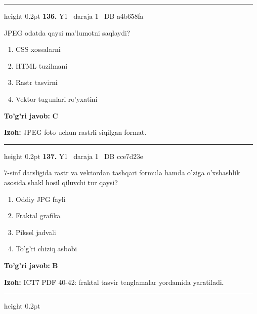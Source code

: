 \documentclass[10pt,a4paper,oneside]{article}
\begin{document}
\vspace{2mm}\hrule height 0.2pt \vspace{4mm}
\hypertarget{q136}{\textbf{\color{ink}136.}}  {\color{muted}\scriptsize Y1 \textbullet\ daraja 1 \textbullet\ DB a4b658fa}
\par
JPEG odatda qaysi ma'lumotni saqlaydi?
\begin{enumerate}[label=\Alph*),leftmargin=9mm]
\item CSS xossalarni
\item HTML tuzilmani
\item Rastr tasvirni
\item Vektor tugunlari ro'yxatini
\end{enumerate}
\begin{tcolorbox}[enhanced,breakable,colback=teal!4,colframe=teal!45!black,boxrule=0.45pt,arc=1.2mm,left=2.8mm,right=2.8mm,top=2mm,bottom=2mm,before skip=2mm,after skip=2mm]
\textbf{\color{teal}To'g'ri javob:} \textbf{C}
\par\smallskip
\textbf{Izoh:} JPEG foto uchun rastrli siqilgan format.
\end{tcolorbox}
\vspace{2mm}\hrule height 0.2pt \vspace{4mm}
\hypertarget{q137}{\textbf{\color{ink}137.}}  {\color{muted}\scriptsize Y1 \textbullet\ daraja 1 \textbullet\ DB cce7d23e}
\par
7-sinf darsligida rastr va vektordan tashqari formula hamda o'ziga o'xshashlik asosida shakl hosil qiluvchi tur qaysi?
\begin{enumerate}[label=\Alph*),leftmargin=9mm]
\item Oddiy JPG fayli
\item Fraktal grafika
\item Piksel jadvali
\item To'g'ri chiziq asbobi
\end{enumerate}
\begin{tcolorbox}[enhanced,breakable,colback=teal!4,colframe=teal!45!black,boxrule=0.45pt,arc=1.2mm,left=2.8mm,right=2.8mm,top=2mm,bottom=2mm,before skip=2mm,after skip=2mm]
\textbf{\color{teal}To'g'ri javob:} \textbf{B}
\par\smallskip
\textbf{Izoh:} ICT7 PDF 40-42: fraktal tasvir tenglamalar yordamida yaratiladi.
\end{tcolorbox}
\vspace{2mm}\hrule height 0.2pt \vspace{4mm}
\end{document}
